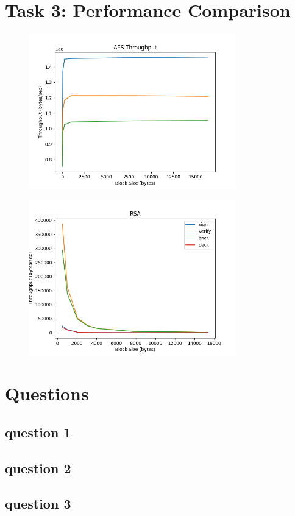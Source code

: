\documentclass[11pt]{article}
\begin{document}
\section*{Task 3: Performance Comparison}
\begin{figure}
	\centering
	\includegraphics[width=0.8\textwidth]{./plts/aes.png}
	\label{fig.1: Performance of AES}
\end{figure}

\begin{figure}
	\centering
	\includegraphics[width=0.8\textwidth]{./plts/rsa.png}
	\label{fig.2: Performance of RSA}
\end{figure}

\section*{Questions}
\subsection*{question 1}
\subsection*{question 2}
\subsection*{question 3}
\end{document}
